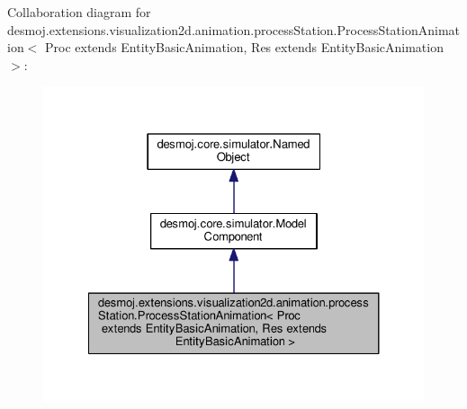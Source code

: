 Collaboration diagram for desmoj.\-extensions.\-visualization2d.\-animation.\-process\-Station.\-Process\-Station\-Animation$<$ Proc extends Entity\-Basic\-Animation, Res extends Entity\-Basic\-Animation $>$\-:
\nopagebreak
\begin{figure}[H]
\begin{center}
\leavevmode
\includegraphics[width=326pt]{classdesmoj_1_1extensions_1_1visualization2d_1_1animation_1_1process_station_1_1_process_stationed508f3d0ff6755d3419c2a3eb8b07cb}
\end{center}
\end{figure}
